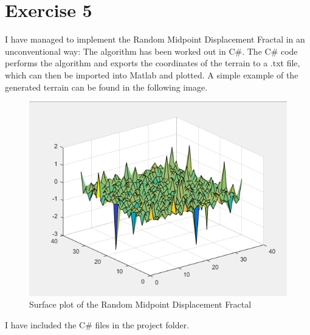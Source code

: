 \section*{Exercise 5}
I have managed to implement the Random Midpoint Displacement Fractal in an unconventional way: The algorithm has been worked out in C\#. The C\# code performs the algorithm and exports the coordinates of the terrain to a .txt file, which can then be imported into Matlab and plotted. A simple example of the generated terrain can be found in the following image.\\

\begin{figure}[ht]
	\includegraphics{images/surface}
	\caption{Surface plot of the Random Midpoint Displacement Fractal}
\end{figure}

I have included the C\# files in the project folder.